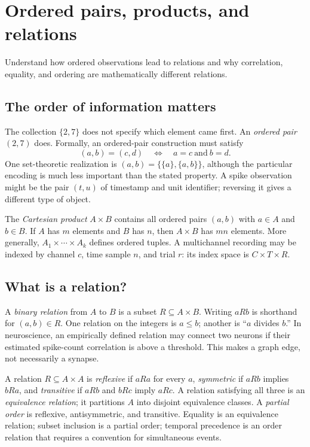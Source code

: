 \chapter{Ordered pairs, products, and relations}\label{ch:relations}
\begin{readergoal}Understand how ordered observations lead to relations and why correlation, equality, and ordering are mathematically different relations.\end{readergoal}
\section{The order of information matters}
The collection $\{2,7\}$ does not specify which element came first. An \emph{ordered pair} $(2,7)$ does. Formally, an ordered-pair construction must satisfy
\[(a,b)=(c,d)\quad\Longleftrightarrow\quad a=c\ \text{and}\ b=d.\]
One set-theoretic realization is $(a,b)=\{\{a\},\{a,b\}\}$, although the particular encoding is much less important than the stated property. A spike observation might be the pair $(t,u)$ of timestamp and unit identifier; reversing it gives a different type of object.

The \emph{Cartesian product} $A\times B$ contains all ordered pairs $(a,b)$ with $a\in A$ and $b\in B$. If $A$ has $m$ elements and $B$ has $n$, then $A\times B$ has $mn$ elements. More generally, $A_1\times\cdots\times A_k$ defines ordered tuples. A multichannel recording may be indexed by channel $c$, time sample $n$, and trial $r$: its index space is $C\times T\times R$.

\section{What is a relation?}
A \emph{binary relation} from $A$ to $B$ is a subset $R\subseteq A\times B$. Writing $aRb$ is shorthand for $(a,b)\in R$. One relation on the integers is $a\le b$; another is ``$a$ divides $b$.'' In neuroscience, an empirically defined relation may connect two neurons if their estimated spike-count correlation is above a threshold. This makes a graph edge, not necessarily a synapse.

A relation $R\subseteq A\times A$ is \emph{reflexive} if $aRa$ for every $a$, \emph{symmetric} if $aRb$ implies $bRa$, and \emph{transitive} if $aRb$ and $bRc$ imply $aRc$. A relation satisfying all three is an \emph{equivalence relation}; it partitions $A$ into disjoint equivalence classes. A \emph{partial order} is reflexive, antisymmetric, and transitive. Equality is an equivalence relation; subset inclusion is a partial order; temporal precedence is an order relation that requires a convention for simultaneous events.

